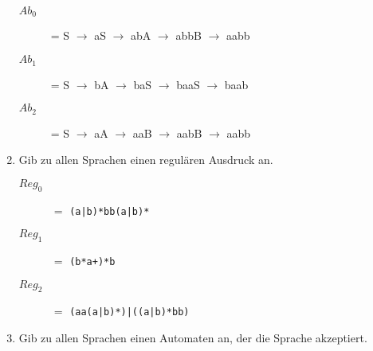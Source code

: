 \documentclass{lehramt-informatik-aufgabe}
\begin{document}
\begin{enumerate}
\begin{liAntwort}
\begin{description}
\item[$Ab_0$] = S $\rightarrow$ aS $\rightarrow$ abA $\rightarrow$ abbB $\rightarrow$ aabb
\item[$Ab_1$] = S $\rightarrow$ bA $\rightarrow$ baS $\rightarrow$ baaS $\rightarrow$ baab
\item[$Ab_2$] = S $\rightarrow$ aA $\rightarrow$ aaB $\rightarrow$ aabB $\rightarrow$ aabb
\end{description}

\end{liAntwort}

\item Gib zu allen Sprachen einen regulären Ausdruck an.
\begin{liAntwort}
\begin{description}
\item[$Reg_0$] $=$ \texttt{(a|b)*bb(a|b)*}

\item[$Reg_1$] $=$ \texttt{(b*a+)*b}

\item[$Reg_2$] $=$ \texttt{(aa(a|b)*)|((a|b)*bb)}
\end{description}
\end{liAntwort}


\item Gib zu allen Sprachen einen Automaten an, der die Sprache
akzeptiert.

\end{enumerate}
\end{document}
